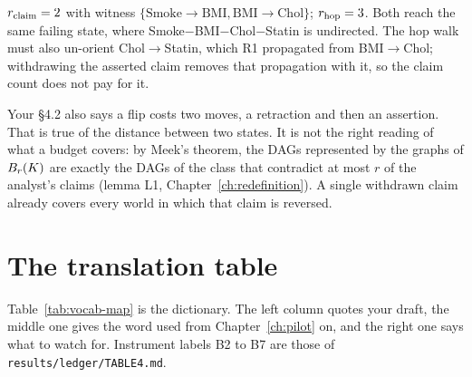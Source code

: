 %
{$r_{\mathrm{claim}} = 2$ with witness $\{\text{Smoke}\to\text{BMI}, \text{BMI}\to\text{Chol}\}$; $r_{\mathrm{hop}} = 3$. Both
reach the same failing state, where Smoke$-$BMI$-$Chol$-$Statin is undirected. The hop walk must also
un-orient Chol$\to$Statin, which R1 propagated from BMI$\to$Chol; withdrawing the asserted claim removes
that propagation with it, so the claim count does not pay for it.}

Your \S4.2 also says a flip costs two moves, a retraction and then an assertion. That is true of the
distance between two states. It is not the right reading of what a budget covers: by Meek's theorem,
the DAGs represented by the graphs of $B_{r}(K)$ are exactly the DAGs of the class that contradict at
most $r$ of the analyst's claims (lemma L1, Chapter~\ref{ch:redefinition}). A single withdrawn claim
already covers every world in which that claim is reversed.

\begin{antes}
\end{antes}

\section{The translation table}

Table~\ref{tab:vocab-map} is the dictionary. The left column quotes your draft, the middle one gives
the word used from Chapter~\ref{ch:pilot} on, and the right one says what to watch for. Instrument
labels B2 to B7 are those of \texttt{results/\allowbreak ledger/\allowbreak TABLE4.md}.

